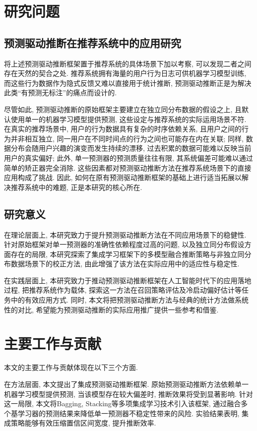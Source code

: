 \documentclass[a4paper, AutoFakeBold, UTF8]{ctexrep}
\theoremstyle{plain}
\numberwithin{equation}{chapter}
\begin{document}
\section{研究问题}
\subsection{预测驱动推断在推荐系统中的应用研究}

将上述预测驱动推断框架置于推荐系统的具体场景下加以考察, 可以发现二者之间存在天然的契合之处. 推荐系统拥有海量的用户行为日志可供机器学习模型训练, 而这些行为数据作为隐式反馈又难以直接用于统计推断, 预测驱动推断正是为解决此类``有预测无标注''的痛点而设计的. 

尽管如此, 预测驱动推断的原始框架主要建立在独立同分布数据的假设之上, 且默认使用单一的机器学习模型提供预测, 这些设定与推荐系统的实际运用场景不符. 在真实的推荐场景中, 用户的行为数据具有复杂的时序依赖关系, 且用户之间的行为并非相互独立, 同一用户在不同时间点的行为之间也可能存在内在关联; 同样, 数据分布会随用户兴趣的演变而发生持续的漂移, 过去积累的数据可能难以反映当前用户的真实偏好; 此外, 单一预测器的预测质量往往有限, 其系统偏差可能难以通过简单的矫正器完全消除. 这些因素都对预测驱动推断方法在推荐系统场景下的直接应用构成了挑战. 因此, 如何在原有预测驱动推断框架的基础上进行适当拓展以解决推荐系统中的难题, 正是本研究的核心所在. 

\subsection{研究意义}

在理论层面上, 本研究致力于提升预测驱动推断方法在不同应用场景下的稳健性. 针对原始框架对单一预测器的准确性依赖程度过高的问题, 以及独立同分布假设方面存在的局限, 本研究探索了集成学习框架下的多模型融合推断策略与非独立同分布数据场景下的校正方法, 由此增强了该方法在实际应用中的适应性与稳定性. 

在实践层面上, 本研究致力于推动预测驱动推断框架在人工智能时代下的应用落地过程, 把推荐系统作为载体, 探索这一方法在召回策略评估及冷启动偏好估计等任务中的有效应用方式. 同时, 本文将把预测驱动推断方法与经典的统计方法做系统性的对比, 希望能为预测驱动推断的实际应用推广提供一些参考和借鉴. 

\section{主要工作与贡献}

本文的主要工作与贡献体现在以下三个方面. 

在方法层面, 本文提出了集成预测驱动推断框架. 原始预测驱动推断方法依赖单一机器学习模型提供预测, 当该模型存在较大偏差时, 推断效果将受到显著影响. 针对这一局限, 本文将Bagging, Stacking等多项集成学习技术引入该框架, 通过融合多个基学习器的预测结果来降低单一预测器不稳定性带来的风险. 实验结果表明, 集成策略能够有效压缩置信区间宽度, 提升推断效率. 
\end{document}
